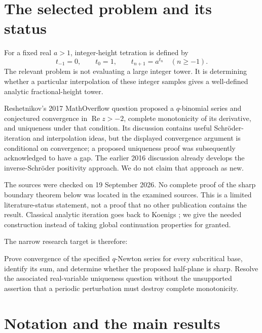 \documentclass[11pt,letterpaper]{article}
\theoremstyle{definition}\newtheorem{definition}[theorem]{Definition}
\theoremstyle{remark}\newtheorem{remark}[theorem]{Remark}
\newcommand{\Ree}{\operatorname{Re}}
\numberwithin{equation}{section}
\begin{document}
\setcounter{tocdepth}{1}
\tableofcontents
\newpage

\section{The selected problem and its status}

For a fixed real $a>1$, integer-height tetration is defined by
\begin{equation}\label{eq:towers}
 t_{-1}=0,\qquad t_0=1,\qquad t_{n+1}=a^{t_n}\quad(n\geq -1).
\end{equation}
The relevant problem is not evaluating a large integer tower. It is determining whether a particular interpolation of these integer samples gives a well-defined analytic fractional-height tower.

Reshetnikov's 2017 MathOverflow question \cite{MO2017} proposed a $q$-binomial series and conjectured convergence in $\Ree z>-2$, complete monotonicity of its derivative, and uniqueness under that condition. Its discussion contains useful Schr\"oder-iteration and interpolation ideas, but the displayed convergence argument is conditional on convergence; a proposed uniqueness proof was subsequently acknowledged to have a gap. The earlier 2016 discussion \cite{MSE2016} already develops the inverse-Schr\"oder positivity approach. We do not claim that approach as new.

The sources were checked on 19 September 2026. No complete proof of the sharp boundary theorem below was located in the examined sources. This is a limited literature-status statement, not a proof that no other publication contains the result. Classical analytic iteration goes back to Koenigs \cite{Koenigs}; we give the needed construction instead of taking global continuation properties for granted.

The narrow research target is therefore:
\begin{tcolorbox}[colback=Pale,colframe=Accent,title={Selected problem},fonttitle=\bfseries]
Prove convergence of the specified $q$-Newton series for every subcritical base, identify its sum, and determine whether the proposed half-plane is sharp. Resolve the associated real-variable uniqueness question without the unsupported assertion that a periodic perturbation must destroy complete monotonicity.
\end{tcolorbox}

\section{Notation and the main results}
\end{document}
